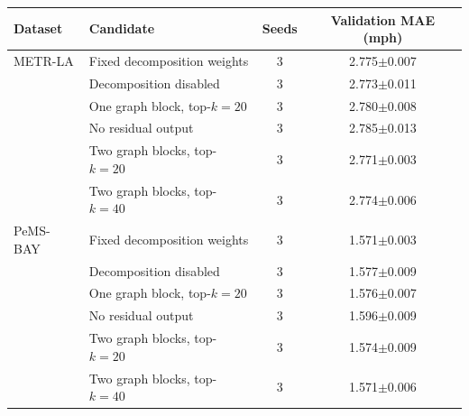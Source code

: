 \begin{tabular}{llcc}
\toprule
Dataset & Candidate & Seeds & Validation MAE (mph)\\
\midrule
METR-LA & Fixed decomposition weights & 3 & 2.775$\pm$0.007\\
 & Decomposition disabled & 3 & 2.773$\pm$0.011\\
 & One graph block, top-$k=20$ & 3 & 2.780$\pm$0.008\\
 & No residual output & 3 & 2.785$\pm$0.013\\
 & Two graph blocks, top-$k=20$ & 3 & 2.771$\pm$0.003\\
 & Two graph blocks, top-$k=40$ & 3 & 2.774$\pm$0.006\\
\midrule
PeMS-BAY & Fixed decomposition weights & 3 & 1.571$\pm$0.003\\
 & Decomposition disabled & 3 & 1.577$\pm$0.009\\
 & One graph block, top-$k=20$ & 3 & 1.576$\pm$0.007\\
 & No residual output & 3 & 1.596$\pm$0.009\\
 & Two graph blocks, top-$k=20$ & 3 & 1.574$\pm$0.009\\
 & Two graph blocks, top-$k=40$ & 3 & 1.571$\pm$0.006\\
\bottomrule
\end{tabular}